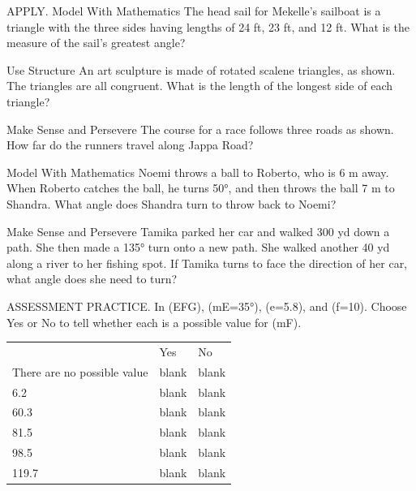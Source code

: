 \documentclass{article}
\newenvironment{practice}[2]{}{}        %
\newcommand{\answer}[1]{}               %
\newcommand{\placeholder}[2]{}          %
\newcommand{\te}[1]{}                   %
\begin{document}
\begin{practice}{30}{2}
APPLY. Model With Mathematics The head sail for Mekelle's sailboat is a triangle with the three sides having lengths of 24 ft, 23 ft, and 12 ft. What is the measure of the sail's greatest angle?
\answer{about 79.9°}
\end{practice}
\begin{practice}{31}{2}
Use Structure An art sculpture is made of rotated scalene triangles, as shown. The triangles are all congruent. What is the length of the longest side of each triangle?
\placeholder{illustration}{Gray sculpture of three intersecting rotated open triangular frames on a base. Foreground triangle has bottom dimension 40 in., right side dimension 78 in., included lower right angle 100°.}
\answer{about 93.6 in.}
\end{practice}
\begin{practice}{32}{2}
Make Sense and Persevere The course for a race follows three roads as shown. How far do the runners travel along Jappa Road?
\placeholder{map}{Three gray roads enclose a black triangular route: Jappa Rd. horizontal top, Ash St. descends right from upper left to bottom, Carson St. ascends right from bottom to upper right. Ash side 38 yd, bottom angle 80°, upper right angle 60°. Trees, buildings and parked cars surround roads.}
\answer{about 43.2 yd}
\end{practice}
\begin{practice}{33}{3}
Model With Mathematics Noemi throws a ball to Roberto, who is 6 m away. When Roberto catches the ball, he turns 50°, and then throws the ball 7 m to Shandra. What angle does Shandra turn to throw back to Noemi?
\answer{about 55.6°}
\end{practice}
\begin{practice}{34}{3}
Make Sense and Persevere Tamika parked her car and walked 300 yd down a path. She then made a 135° turn onto a new path. She walked another 40 yd along a river to her fishing spot. If Tamika turns to face the direction of her car, what angle does she need to turn?
\answer{about 40.1°}
\end{practice}
\begin{practice}{35}{2}
ASSESSMENT PRACTICE. In (\triangle EFG), (m\angle E=35°), (e=5.8), and (f=10). Choose Yes or No to tell whether each is a possible value for (m\angle F).
\begin{tabular}{lll}
 & Yes & No \\
There are no possible value & blank & blank \\
6.2 & blank & blank \\
60.3 & blank & blank \\
81.5 & blank & blank \\
98.5 & blank & blank \\
119.7 & blank & blank \\
\end{tabular}
\answer{No; No; No; Yes; Yes; No.}
\te{Printed ``There are no possible value''; likely ``values''.}
\end{practice}
\end{document}
